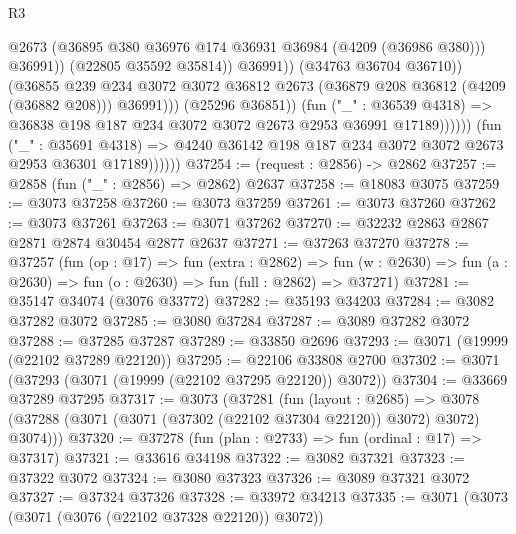 \begin{lexlean}{R3}
\begin{coremodule}
                                          @2673
                                          (@36895
                                            @380
                                            @36976
                                            @174
                                            @36931
                                            @36984
                                            (@4209 (@36986 @380)))
                                          @36991))
                                      (@22805 @35592 @35814))
                                    @36991))
                                (@34763 @36704 @36710))
                              (@36855
                                @239
                                @234
                                @3072
                                @3072
                                @36812
                                @2673
                                (@36879 @208 @36812 (@4209 (@36882 @208)))
                                @36991)))
                          (@25296 @36851))
                        (fun ("_" : @36539 @4318) =>
                        @36838 @198 @187 @234 @3072 @3072 @2673 @2953 @36991 @17189))))))
              (fun ("_" : @35691 @4318) =>
              @4240 @36142 @198 @187 @234 @3072 @3072 @2673 @2953 @36301 @17189))))))
@37254 := (request : @2856) -> @2862
@37257 := @2858 (fun ("_" : @2856) => @2862) @2637
@37258 := @18083 @3075
@37259 := @3073 @37258
@37260 := @3073 @37259
@37261 := @3073 @37260
@37262 := @3073 @37261
@37263 := @3071 @37262
@37270 := @32232 @2863 @2867 @2871 @2874 @30454 @2877 @2637
@37271 := @37263 @37270
@37278 := @37257
    (fun (op : @17) =>
    fun (extra : @2862) =>
    fun (w : @2630) => fun (a : @2630) => fun (o : @2630) => fun (full : @2862) => @37271)
@37281 := @35147 @34074 (@3076 @33772)
@37282 := @35193 @34203
@37284 := @3082 @37282 @3072
@37285 := @3080 @37284
@37287 := @3089 @37282 @3072
@37288 := @37285 @37287
@37289 := @33850 @2696
@37293 := @3071 (@19999 (@22102 @37289 @22120))
@37295 := @22106 @33808 @2700
@37302 := @3071 (@37293 (@3071 (@19999 (@22102 @37295 @22120)) @3072))
@37304 := @33669 @37289 @37295
@37317 := @3073
    (@37281
      (fun (layout : @2685) =>
      @3078 (@37288 (@3071 (@3071 (@37302 (@22102 @37304 @22120)) @3072) @3072) @3074)))
@37320 := @37278 (fun (plan : @2733) => fun (ordinal : @17) => @37317)
@37321 := @33616 @34198
@37322 := @3082 @37321
@37323 := @37322 @3072
@37324 := @3080 @37323
@37326 := @3089 @37321 @3072
@37327 := @37324 @37326
@37328 := @33972 @34213
@37335 := @3071 (@3073 (@3071 (@3076 (@22102 @37328 @22120)) @3072))

\end{coremodule}
\end{lexlean}
